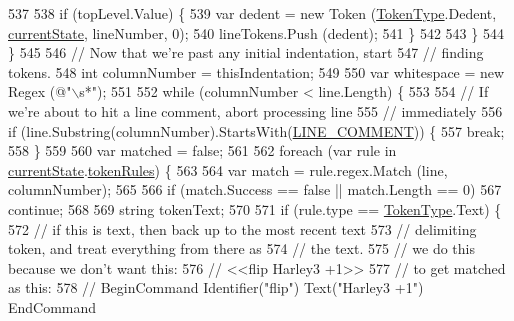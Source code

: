 \begin{DoxyCode}
537 
538                     \textcolor{keywordflow}{if} (topLevel.Value) \{
539                         var dedent = \textcolor{keyword}{new} Token (\hyperlink{a00029_a301aa7c866593a5b625a8fc158bbeace}{TokenType}.Dedent, 
      \hyperlink{a00099_ac90b7dce8103425a148f9e8588f14137}{currentState}, lineNumber, 0);
540                         lineTokens.Push (dedent);
541                     \}
542 
543                 \}
544             \}
545 
546             \textcolor{comment}{// Now that we're past any initial indentation, start}
547             \textcolor{comment}{// finding tokens.}
548             \textcolor{keywordtype}{int} columnNumber = thisIndentation;
549 
550             var whitespace = \textcolor{keyword}{new} Regex (\textcolor{stringliteral}{@"\(\backslash\)s*"});
551 
552             \textcolor{keywordflow}{while} (columnNumber < line.Length) \{
553 
554                 \textcolor{comment}{// If we're about to hit a line comment, abort processing line}
555                 \textcolor{comment}{// immediately}
556                 \textcolor{keywordflow}{if} (line.Substring(columnNumber).StartsWith(\hyperlink{a00099_a29c457125cc4876f8571f5d9afa372e2}{LINE\_COMMENT})) \{
557                     \textcolor{keywordflow}{break};
558                 \}
559 
560                 var matched = \textcolor{keyword}{false};
561 
562                 \textcolor{keywordflow}{foreach} (var rule \textcolor{keywordflow}{in} \hyperlink{a00099_ac90b7dce8103425a148f9e8588f14137}{currentState}.\hyperlink{a00100_adf6563b1dc6f3ef80ed13c2b15b7be03}{tokenRules}) \{
563                     
564                     var match = rule.regex.Match (line, columnNumber);
565 
566                     \textcolor{keywordflow}{if} (match.Success == \textcolor{keyword}{false} || match.Length == 0)
567                         \textcolor{keywordflow}{continue};
568 
569                     \textcolor{keywordtype}{string} tokenText;
570 
571                     \textcolor{keywordflow}{if} (rule.type == \hyperlink{a00029_a301aa7c866593a5b625a8fc158bbeace}{TokenType}.Text) \{
572                         \textcolor{comment}{// if this is text, then back up to the most recent text }
573                         \textcolor{comment}{// delimiting token, and treat everything from there as}
574                         \textcolor{comment}{// the text.}
575                         \textcolor{comment}{// we do this because we don't want this:}
576                         \textcolor{comment}{//    <<flip Harley3 +1>>}
577                         \textcolor{comment}{// to get matched as this:}
578                         \textcolor{comment}{//    BeginCommand Identifier("flip") Text("Harley3 +1") EndCommand}

\end{DoxyCode}
